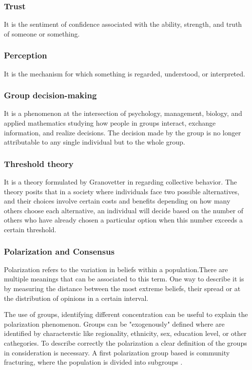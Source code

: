 \subsubsection{Trust} It is the sentiment of confidence associated with the ability, strength, and truth of someone or something. 

\subsubsection{Perception} It is the mechanism for which something is regarded, understood, or interpreted.

\subsubsection{Group decision-making} It is a phenomenon at the intersection of psychology, management, biology, and applied mathematics studying how people in groups interact, exchange information, and realize decisions. The decision made by the group is no longer attributable to any single individual but to the whole group. 
 
\subsubsection{Threshold theory}

It is a theory formulated by Granovetter in \cite{Granovetter_1978} regarding collective behavior. The theory posits that in a society where individuals face two possible alternatives, and their choices involve certain costs and benefits depending on how many others choose each alternative, an individual will decide based on the number of others who have already chosen a particular option when this number exceeds a certain threshold.

\subsubsection{Polarization and Consensus}

Polarization refers to the variation in beliefs within a population.There are multiple meanings that can be associated to this term. One way to describe it is by measuring the distance between the most extreme beliefs, their spread or at the distribution of opinions in a certain interval. 

 The use of groups, identifying different concentration can be useful to explain the polarization phenomenon. Groups can be "exogenously" defined where are identified by characterstic like regionality, ethnicity, sex, education level, or other cathegories. To describe correctly the polarization a clear definition of the groups in consideration is necessary. 
 A first polarization group based is community fracturing, where the population is divided into subgroups\cite{Bramson_2017} .
 
